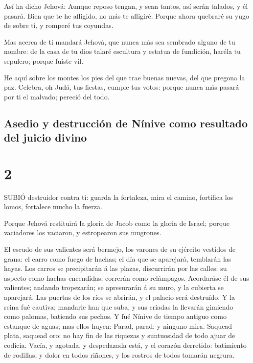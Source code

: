  Así ha dicho Jehová: Aunque reposo tengan, y sean tantos,
así serán talados, y él pasará. Bien que te he afligido, no más te
afligiré.  Porque ahora quebraré su yugo de sobre ti, y
romperé tus coyundas.

 Mas acerca de ti mandará Jehová, que nunca más sea
sembrado alguno de tu nombre: de la casa de tu dios talaré escultura y
estatua de fundición, haréla tu sepulcro; porque fuiste vil.

 He aquí sobre los montes los pies del que trae buenas
nuevas, del que pregona la paz. Celebra, oh Judá, tus fiestas, cumple
tus votos: porque nunca más pasará por ti el malvado; pereció del todo.

\hypertarget{asedio-y-destrucciuxf3n-de-nuxednive-como-resultado-del-juicio-divino}{%
\subsection{Asedio y destrucción de Nínive como resultado del juicio
divino}\label{asedio-y-destrucciuxf3n-de-nuxednive-como-resultado-del-juicio-divino}}

\hypertarget{section-1}{%
\section{2}\label{section-1}}

 SUBIÓ destruidor contra ti: guarda la fortaleza, mira el
camino, fortifica los lomos, fortalece mucho la fuerza.

 Porque Jehová restituirá la gloria de Jacob como la gloria
de Israel; porque vaciadores los vaciaron, y estropearon sus mugrones.

 El escudo de sus valientes será bermejo, los varones de su
ejército vestidos de grana: el carro como fuego de hachas; el día que se
aparejará, temblarán las hayas.  Los carros se precipitarán
á las plazas, discurrirán por las calles: su aspecto como hachas
encendidas; correrán como relámpagos.  Acordaráse él de sus
valientes; andando tropezarán; se apresurarán á su muro, y la cubierta
se aparejará.  Las puertas de los ríos se abrirán, y el
palacio será destruído.  Y la reina fué cautiva; mandarle
han que suba, y sus criadas la llevarán gimiendo como palomas, batiendo
sus pechos.  Y fué Nínive de tiempo antiguo como estanque de
aguas; mas ellos huyen: Parad, parad; y ninguno mira. 
Saquead plata, saquead oro: no hay fin de las riquezas y suntuosidad de
todo ajuar de codicia.  Vacía, y agotada, y despedazada
está, y el corazón derretido: batimiento de rodillas, y dolor en todos
riñones, y los rostros de todos tomarán negrura.

